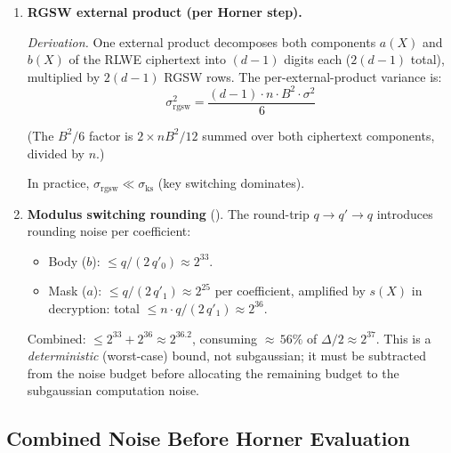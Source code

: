 \documentclass[11pt,a4paper]{article}
\begin{document}
\begin{enumerate}[nosep]
    \item \textbf{RGSW external product (per Horner step).}

    \emph{Derivation.}
    One external product decomposes both components $a(X)$ and $b(X)$ of the RLWE ciphertext into $(d\!-\!1)$ digits each ($2(d\!-\!1)$ total), multiplied by $2(d\!-\!1)$ RGSW rows.
    The per-external-product variance is:
    \begin{equation}
        \sigma_{\mathrm{rgsw}}^2 = \frac{(d\!-\!1) \cdot n \cdot B^2 \cdot \sigma^2}{6}
        \label{eq:noise-rgsw}
    \end{equation}

    (The $B^2/6$ factor is $2 \times nB^2/12$ summed over both ciphertext components, divided by $n$.)

    In practice, $\sigma_{\mathrm{rgsw}} \ll \sigma_{\mathrm{ks}}$ (key switching dominates).

    \item \textbf{Modulus switching rounding} ().
    The round-trip $q \to q' \to q$ introduces rounding noise per coefficient:
    \begin{itemize}[nosep]
        \item Body ($b$): $\le q/(2\,q'_0) \approx 2^{33}$.
        \item Mask ($a$): $\le q/(2\,q'_1) \approx 2^{25}$ per coefficient, amplified by $s(X)$ in decryption: total $\le n \cdot q/(2\,q'_1) \approx 2^{36}$.
    \end{itemize}
    Combined: $\le 2^{33} + 2^{36} \approx 2^{36.2}$, consuming ${\approx}\,56\%$ of $\Delta/2 \approx 2^{37}$.
    This is a \emph{deterministic} (worst-case) bound, not subgaussian; it must be subtracted from the noise budget before allocating the remaining budget to the subgaussian computation noise.
\end{enumerate}

\subsection{Combined Noise Before Horner Evaluation}\label{sec:noise-combined}
\end{document}
